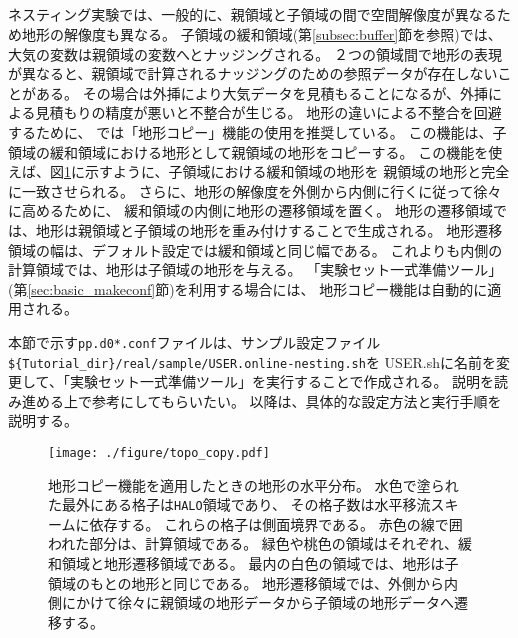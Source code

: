 \subsection{\SubsecCopyTopo} \label{subsec:nest_topo}
ネスティング実験では、一般的に、親領域と子領域の間で空間解像度が異なるため地形の解像度も異なる。
子領域の緩和領域(第\ref{subsec:buffer}節を参照)では、大気の変数は親領域の変数へとナッジングされる。
２つの領域間で地形の表現が異なると、親領域で計算されるナッジングのための参照データが存在しないことがある。
その場合は外挿により大気データを見積もることになるが、外挿による見積もりの精度が悪いと不整合が生じる。
%
地形の違いによる不整合を回避するために、
\scalerm では「地形コピー」機能の使用を推奨している。
この機能は、子領域の緩和領域における地形として親領域の地形をコピーする。
この機能を使えば、図\ref{fig_topocopy}に示すように、子領域における緩和領域の地形を
親領域の地形と完全に一致させられる。
さらに、地形の解像度を外側から内側に行くに従って徐々に高めるために、
緩和領域の内側に地形の遷移領域を置く。
地形の遷移領域では、地形は親領域と子領域の地形を重み付けすることで生成される。
地形遷移領域の幅は、デフォルト設定では緩和領域と同じ幅である。
これよりも内側の計算領域では、地形は子領域の地形を与える。
「実験セット一式準備ツール」(第\ref{sec:basic_makeconf}節)を利用する場合には、
地形コピー機能は自動的に適用される。


本節で示す\verb|pp.d0*.conf|ファイルは、サンプル設定ファイル\\
\verb|${Tutorial_dir}/real/sample/USER.online-nesting.sh|を
USER.shに名前を変更して、「実験セット一式準備ツール」を実行することで作成される。
説明を読み進める上で参考にしてもらいたい。
以降は、具体的な設定方法と実行手順を説明する。


\begin{figure}[htb]
\begin{center}
  \texttt{[image: ./figure/topo\_copy.pdf]}\\
  \caption{地形コピー機能を適用したときの地形の水平分布。
水色で塗られた最外にある格子は\texttt{HALO}領域であり、
その格子数は水平移流スキームに依存する。
これらの格子は側面境界である。
赤色の線で囲われた部分は、計算領域である。
緑色や桃色の領域はそれぞれ、緩和領域と地形遷移領域である。
最内の白色の領域では、地形は子領域のもとの地形と同じである。
地形遷移領域では、外側から内側にかけて徐々に親領域の地形データから子領域の地形データへ遷移する。}
  \label{fig_topocopy}
\end{center}
\end{figure}


